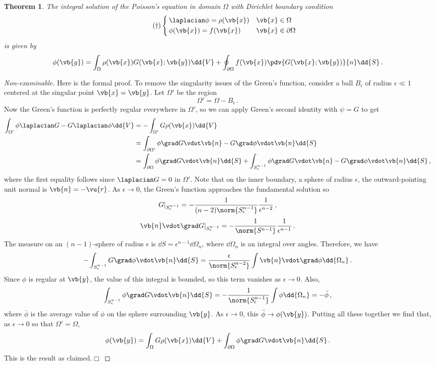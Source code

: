 \documentclass{article}
\theoremstyle{plain}\theoremheaderfont{\normalfont\itshape}\theorembodyfont{\rmfamily}\theoremseparator{.}\newtheorem*{rem}{Remark}\newtheorem*{ex}{Example}\newtheorem*{proof}{Proof}\newtheorem*{altp}{Alternative proof}
\theoremstyle{plain}\theoremheaderfont{\normalfont\bfseries}\theorembodyfont{\rmfamily}\theoremseparator{.}\newtheorem{thm}{Theorem}[section]\newtheorem{lem}[thm]{Lemma}\newtheorem{prop}[thm]{Proposition}\newtheorem*{cor}{Corollary}\newtheorem{defn}[thm]{Definition}\newtheorem{clm}[thm]{Claim}\newtheorem{clminproof}{Claim}
\theoremstyle{break}\theoremheaderfont{\normalfont\itshape}\theorembodyfont{\rmfamily}\theoremseparator{.\medskip}\newtheorem*{proofskip}{Proof}\newtheorem*{exs}{Examples}\newtheorem*{rems}{Remarks}
\theoremstyle{break}\theoremheaderfont{\normalfont\bfseries}\theorembodyfont{\rmfamily}\theoremseparator{.\medskip}\newtheorem{lemskip}[thm]{Lemma}\newtheorem{defnskip}[thm]{Definition}\newtheorem{propskip}[thm]{Proposition}\newtheorem{thmskip}[thm]{Theorem}
\numberwithin{equation}{section}
\newcommand{\qed}{\hfill\ensuremath{\Box}}
\begin{document}
	\begin{thm}\label{intpoi}
		The integral solution of the Poisson's equation in domain \(\Omega\) with Dirichlet boundary condition
		\begin{equation}\tag{\(\dagger\)}
			\left\{\begin{aligned}
				&\,\laplacian\phi=\rho(\vb{x}) && \vb{x}\in\Omega\\
				&\,\phi(\vb{x})=f(\vb{x}) && \vb{x}\in\partial\Omega
			\end{aligned}\right.
		\end{equation}
		is given by
		\[\phi(\vb{y})=\int_\Omega\rho(\vb{x})G(\vb{x};\vb{y})\dd{V}+\oint_{\partial\Omega}f(\vb{x})\pdv{G(\vb{x};\vb{y})}{n}\dd{S}\,.\]
	\end{thm}
	\begin{proof}[Non-examinable]
		Here is the formal proof. To remove the singularity issues of the Green's function, consider a ball \(B_\epsilon\) of radius \(\epsilon\ll 1\) centered at the singular point \(\vb{x}=\vb{y}\). Let \(\Omega'\) be the region
		\[\Omega'=\Omega-B_\epsilon\,.\]
		Now the Green's function is perfectly regular everywhere in \(\Omega'\), so we can apply Green's second identity with \(\psi=G\) to get
		\begin{align*}
			\int_{\Omega'}\phi\laplacian G-G\laplacian\phi\dd{V}&=-\int_{\Omega'}G\rho(\vb{x})\dd{V}\\
			&=\int_{\partial\Omega'}\phi\grad G\vdot\vb{n}-G\grad\phi\vdot\vb{n}\dd{S}\\
			&=\int_{\partial\Omega}\phi\grad G\vdot\vb{n}\dd{S}+\int_{S_{\epsilon}^{n-1}}\phi\grad G\vdot\vb{n}-G\grad\phi\vdot\vb{n}\dd{S}\,,
		\end{align*}
		where the first equality follows since \(\laplacian G=0\) in \(\Omega'\). Note that on the inner boundary, a sphere of radius \(\epsilon\), the outward-pointing unit normal is \(\vb{n} = -\vu{r}\). As \(\epsilon\to 0\), the Green's function approaches the fundamental solution so
		\[G|_{S_{\epsilon}^{n-1}}=-\frac{1}{(n-2)\norm{S_{\epsilon}^{n-1}}}\frac{1}{\epsilon^{n-2}}\,,\]
		\[\vb{n}\vdot\grad G|_{S_{\epsilon}^{n-1}}=-\frac{1}{\norm{S^{n-1}}}\frac{1}{\epsilon^{n-1}}\,.\]
		The measure on an \((n-1)\)-sphere of radius \(\epsilon\) is \(\dd{S}=\epsilon^{n-1}\dd{\Omega_n}\), where \(\dd{\Omega_n}\) is an integral over angles. Therefore, we have
		\[-\int_{S_{\epsilon}^{n-1}}G\grad\phi\vdot\vb{n}\dd{S}=\frac{\epsilon}{\norm{S_{\epsilon}^{n-2}}}\int\vb{n}\vdot\grad\phi\dd{\Omega_n}\,.\]
		Since \(\phi\) is regular at \(\vb{y}\), the value of this integral is bounded, so this term vanishes as \(\epsilon\to 0\). Also,
		\[\int_{S_{\epsilon}^{n-1}}\phi\grad G\vdot\vb{n}\dd{S}=-\frac{1}{\norm{S_{\epsilon}^{n-1}}}\int\phi\dd{\Omega_n}=-\bar{\phi}\,,\]
		where \(\bar{\phi}\) is the average value of \(\phi\) on the sphere surrounding \(\vb{y}\). As \(\epsilon\to 0\), this \(\bar{\phi}\to\phi(\vb{y})\). Putting all these together we find that, as \(\epsilon\to 0\) so that \(\Omega'=\Omega\),
		\[\phi(\vb{y})=\int_{\Omega}G\rho(\vb{x})\dd{V}+\int_{\partial\Omega}\phi\grad G\vdot\vb{n}\dd{S}\,.\]
		This is the result as claimed.\qed
	\end{proof}
\end{document}
